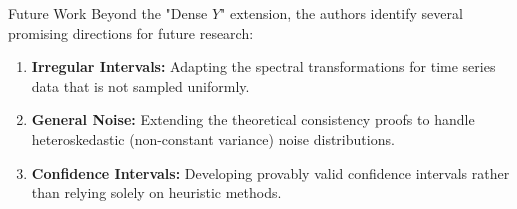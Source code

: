 \begin{frame}{Future Work}
    Beyond the "Dense $Y$" extension, the authors identify several promising directions for future research:
    
    \vspace{0.3cm}
    \begin{enumerate}
        \item \textbf{Irregular Intervals:} Adapting the spectral transformations for time series data that is not sampled uniformly.
        \item \textbf{General Noise:} Extending the theoretical consistency proofs to handle heteroskedastic (non-constant variance) noise distributions.
        \item \textbf{Confidence Intervals:} Developing provably valid confidence intervals rather than relying solely on heuristic methods.
    \end{enumerate}
\end{frame}